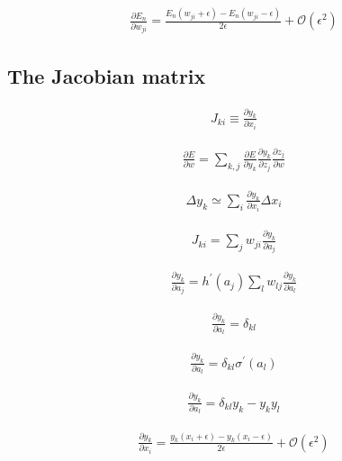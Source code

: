 \documentclass{article}
\begin{document}
\begin{align*}
\frac{\partial E_{n}}{\partial w_{j i}} = \frac{E_{n}(w_{j i} + \epsilon) - E_{n}(w_{j i} - \epsilon)}{2 \epsilon} + \mathcal{O}(\epsilon^{2}) \tag{8.25}
\end{align*}

\subsection{The Jacobian matrix}

\begin{align*}
J_{k i} \equiv \frac{\partial y_{k}}{\partial x_{i}} \tag{8.26}
\end{align*}

\begin{align*}
\frac{\partial E}{\partial w} = \sum_{k, j} \frac{\partial E}{\partial y_{k}} \frac{\partial y_{k}}{\partial z_{j}} \frac{\partial z_{j}}{\partial w} \tag{8.27}
\end{align*}

\begin{align*}
\Delta y_{k} \simeq \sum_{i} \frac{\partial y_{k}}{\partial x_{i}} \Delta x_{i} \tag{8.28}
\end{align*}

\begin{align*}
J_{k i} = \sum_{j} w_{j i} \frac{\partial y_{k}}{\partial a_{j}} \tag{8.29}
\end{align*}

\begin{align*}
\frac{\partial y_{k}}{\partial a_{j}} = h^{\prime}(a_{j}) \sum_{l} w_{l j} \frac{\partial y_{k}}{\partial a_{l}} \tag{8.30}
\end{align*}

\begin{align*}
\frac{\partial y_{k}}{\partial a_{l}} = \delta_{k l} \tag{8.31}
\end{align*}

\begin{align*}
\frac{\partial y_{k}}{\partial a_{l}} = \delta_{k l} \sigma^{\prime}(a_{l}) \tag{8.33}
\end{align*}

\begin{align*}
\frac{\partial y_{k}}{\partial a_{l}} = \delta_{k l} y_{k} - y_{k} y_{l} \tag{8.34}
\end{align*}

\begin{align*}
\frac{\partial y_{k}}{\partial x_{i}} = \frac{y_{k}(x_{i} + \epsilon) - y_{k}(x_{i} - \epsilon)}{2 \epsilon} + \mathcal{O}(\epsilon^{2}) \tag{8.35}
\end{align*}
\end{document}
